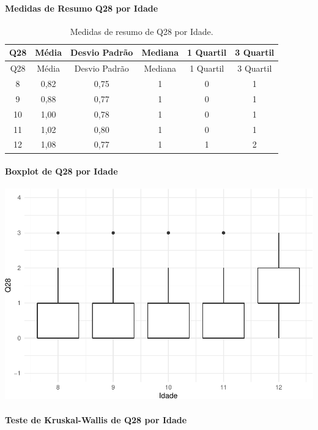 \documentclass[]{article}
\let\oldparagraph\paragraph
\renewcommand{\paragraph}[1]{\oldparagraph{#1}\mbox{}}
\begin{document}
\cleardoublepage

\hypertarget{medidas-de-resumo-q28-por-idade}{%
\paragraph{Medidas de Resumo Q28 por Idade}\label{medidas-de-resumo-q28-por-idade}}

\begin{longtable}[]{@{}cccccc@{}}
\caption{\label{tab:unnamed-chunk-862}Medidas de resumo de Q28 por Idade.}\tabularnewline
\toprule
Q28 & Média & Desvio Padrão & Mediana & 1 Quartil & 3 Quartil\tabularnewline
\midrule
\endfirsthead
\toprule
Q28 & Média & Desvio Padrão & Mediana & 1 Quartil & 3 Quartil\tabularnewline
\midrule
\endhead
8 & 0,82 & 0,75 & 1 & 0 & 1\tabularnewline
9 & 0,88 & 0,77 & 1 & 0 & 1\tabularnewline
10 & 1,00 & 0,78 & 1 & 0 & 1\tabularnewline
11 & 1,02 & 0,80 & 1 & 0 & 1\tabularnewline
12 & 1,08 & 0,77 & 1 & 1 & 2\tabularnewline
\bottomrule
\end{longtable}

\hypertarget{boxplot-de-q28-por-idade}{%
\paragraph{Boxplot de Q28 por Idade}\label{boxplot-de-q28-por-idade}}

\begin{center}\includegraphics[width=0.75\linewidth]{relatorio_covid19_files/figure-latex/unnamed-chunk-863-1} \end{center}

\hypertarget{teste-de-kruskal-wallis-de-q28-por-idade}{%
\paragraph{Teste de Kruskal-Wallis de Q28 por Idade}\label{teste-de-kruskal-wallis-de-q28-por-idade}}
\end{document}
